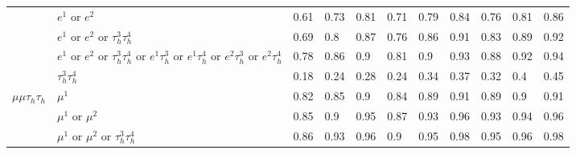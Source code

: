 \begin{table}
{\begin{tabular}{|c|c|c||lllllllll}
\multicolumn{1}{|l|}{} & \multicolumn{2}{l||}{$e^{1}$ or $e^{2}$} & \multicolumn{1}{l|}{0.61} & \multicolumn{1}{l|}{0.73} & \multicolumn{1}{l|}{0.81} & \multicolumn{1}{l|}{0.71} & \multicolumn{1}{l|}{0.79} & \multicolumn{1}{l|}{0.84} & \multicolumn{1}{l|}{0.76} & \multicolumn{1}{l|}{0.81} & \multicolumn{1}{l|}{0.86} \\
\multicolumn{1}{|l|}{} & \multicolumn{2}{l||}{$e^{1}$ or $e^{2}$ or $\tau_{h}^{3}\tau_{h}^{4}$} & \multicolumn{1}{l|}{0.69} & \multicolumn{1}{l|}{0.8} & \multicolumn{1}{l|}{0.87} & \multicolumn{1}{l|}{0.76} & \multicolumn{1}{l|}{0.86} & \multicolumn{1}{l|}{0.91} & \multicolumn{1}{l|}{0.83} & \multicolumn{1}{l|}{0.89} & \multicolumn{1}{l|}{0.92} \\
\multicolumn{1}{|l|}{} & \multicolumn{2}{l||}{$e^{1}$ or $e^{2}$ or $\tau_{h}^{3}\tau_{h}^{4}$ or $e^{1}\tau_{h}^{3}$ or $e^{1}\tau_{h}^{4}$ or $e^{2}\tau_{h}^{3}$ or $e^{2}\tau_{h}^{4}$} & \multicolumn{1}{l|}{0.78} & \multicolumn{1}{l|}{0.86} & \multicolumn{1}{l|}{0.9} & \multicolumn{1}{l|}{0.81} & \multicolumn{1}{l|}{0.9} & \multicolumn{1}{l|}{0.93} & \multicolumn{1}{l|}{0.88} & \multicolumn{1}{l|}{0.92} & \multicolumn{1}{l|}{0.94} \\
\multicolumn{1}{|l|}{} & \multicolumn{2}{l||}{$\tau_{h}^{3}\tau_{h}^{4}$} & \multicolumn{1}{l|}{0.18} & \multicolumn{1}{l|}{0.24} & \multicolumn{1}{l|}{0.28} & \multicolumn{1}{l|}{0.24} & \multicolumn{1}{l|}{0.34} & \multicolumn{1}{l|}{0.37} & \multicolumn{1}{l|}{0.32} & \multicolumn{1}{l|}{0.4} & \multicolumn{1}{l|}{0.45} \\
\hline
\multicolumn{1}{|l|}{$\mu\mu\tau_{h}\tau_{h}$} & \multicolumn{2}{l||}{$\mu^{1}$} & \multicolumn{1}{l|}{0.82} & \multicolumn{1}{l|}{0.85} & \multicolumn{1}{l|}{0.9} & \multicolumn{1}{l|}{0.84} & \multicolumn{1}{l|}{0.89} & \multicolumn{1}{l|}{0.91} & \multicolumn{1}{l|}{0.89} & \multicolumn{1}{l|}{0.9} & \multicolumn{1}{l|}{0.91} \\
\multicolumn{1}{|l|}{} & \multicolumn{2}{l||}{$\mu^{1}$ or $\mu^{2}$} & \multicolumn{1}{l|}{0.85} & \multicolumn{1}{l|}{0.9} & \multicolumn{1}{l|}{0.95} & \multicolumn{1}{l|}{0.87} & \multicolumn{1}{l|}{0.93} & \multicolumn{1}{l|}{0.96} & \multicolumn{1}{l|}{0.93} & \multicolumn{1}{l|}{0.94} & \multicolumn{1}{l|}{0.96} \\
\multicolumn{1}{|l|}{} & \multicolumn{2}{l||}{$\mu^{1}$ or $\mu^{2}$ or $\tau_{h}^{3}\tau_{h}^{4}$} & \multicolumn{1}{l|}{0.86} & \multicolumn{1}{l|}{0.93} & \multicolumn{1}{l|}{0.96} & \multicolumn{1}{l|}{0.9} & \multicolumn{1}{l|}{0.95} & \multicolumn{1}{l|}{0.98} & \multicolumn{1}{l|}{0.95} & \multicolumn{1}{l|}{0.96} & \multicolumn{1}{l|}{0.98} \\

\end{tabular}}
\end{table}
